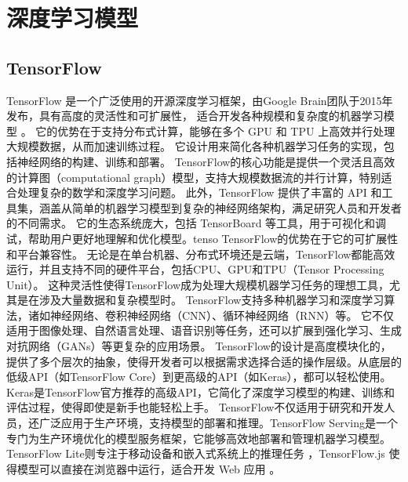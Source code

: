 \documentclass[AutoFakeBold]{LZUThesis-PgD&PhD}
\begin{document}
	\section{深度学习模型}
	
	\subsection{TensorFlow}
	
	TensorFlow 是一个广泛使用的开源深度学习框架，由Google Brain团队于2015年发布，具有高度的灵活性和可扩展性，
	适合开发各种规模和复杂度的机器学习模型 \cite{tensorflow2015-whitepaper}。
	它的优势在于支持分布式计算，能够在多个 GPU 和 TPU 上高效并行处理大规模数据，从而加速训练过程。
	它设计用来简化各种机器学习任务的实现，包括神经网络的构建、训练和部署。
	TensorFlow的核心功能是提供一个灵活且高效的计算图（computational graph）模型，支持大规模数据流的并行计算，特别适合处理复杂的数学和深度学习问题。
	此外，TensorFlow 提供了丰富的 API 和工具集，涵盖从简单的机器学习模型到复杂的神经网络架构，满足研究人员和开发者的不同需求。
	它的生态系统庞大，包括 TensorBoard 等工具，用于可视化和调试，帮助用户更好地理解和优化模型。tenso
	TensorFlow的优势在于它的可扩展性和平台兼容性。
	无论是在单台机器、分布式环境还是云端，TensorFlow都能高效运行，并且支持不同的硬件平台，包括CPU、GPU和TPU（Tensor Processing Unit）。
	这种灵活性使得TensorFlow成为处理大规模机器学习任务的理想工具，尤其是在涉及大量数据和复杂模型时。
	TensorFlow支持多种机器学习和深度学习算法，诸如神经网络、卷积神经网络（CNN）、循环神经网络（RNN）等。
	它不仅适用于图像处理、自然语言处理、语音识别等任务，还可以扩展到强化学习、生成对抗网络（GANs）等更复杂的应用场景。
	TensorFlow的设计是高度模块化的，提供了多个层次的抽象，使得开发者可以根据需求选择合适的操作层级。从底层的低级API（如TensorFlow Core）到更高级的API（如Keras），都可以轻松使用。Keras是TensorFlow官方推荐的高级API，它简化了深度学习模型的构建、训练和评估过程，使得即使是新手也能轻松上手。
	TensorFlow不仅适用于研究和开发人员，还广泛应用于生产环境，支持模型的部署和推理。TensorFlow Serving是一个专门为生产环境优化的模型服务框架，它能够高效地部署和管理机器学习模型。TensorFlow Lite则专注于移动设备和嵌入式系统上的推理任务 \cite{tensorflowlite}，TensorFlow.js 使得模型可以直接在浏览器中运行，适合开发 Web 应用 \cite{tensorflowjs}。
	
\end{document}
